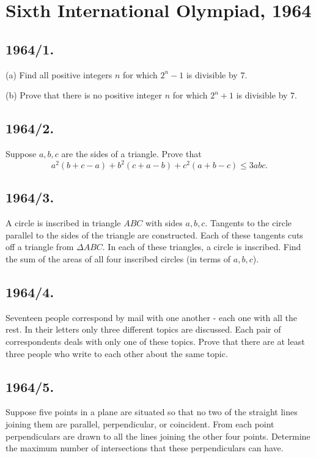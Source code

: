 \documentclass[12pt,thmsa]{article}
\begin{document}
\section{Sixth International Olympiad, 1964}

\subsection{1964/1.}

(a) Find all positive integers $n$ for which $2^{n}-1$ is divisible by $7.$

(b) Prove that there is no positive integer $n$ for which $2^{n}+1$  is
divisible by $7.$

\subsection{1964/2.}

Suppose $a,b,c$ are the sides of a triangle. Prove that
\[
a^{2}(b+c-a)+b^{2}(c+a-b)+c^{2}(a+b-c)\leq 3abc.
\]

\subsection{1964/3.}

A circle is inscribed in triangle $ABC$ with sides $a,b,c.$ Tangents to the
circle parallel to the sides of the triangle are constructed. Each of these
tangents cuts off a triangle from $\Delta ABC.$ In each of these triangles,
a circle is inscribed. Find the sum of the areas of all four inscribed
circles (in terms of $a,b,c$).

\subsection{1964/4.}

Seventeen people correspond by mail with one another - each one with all the
rest. In their letters only three different topics are discussed. Each pair
of correspondents deals with only one of these topics. Prove that there are
at least three people who write to each other about the same topic.

\subsection{1964/5.}

Suppose five points in a plane are situated so that no two of the straight
lines joining them are parallel, perpendicular, or coincident. From each
point perpendiculars are drawn to all the lines joining the other four
points. Determine the maximum number of intersections that these
perpendiculars can have.
\end{document}
